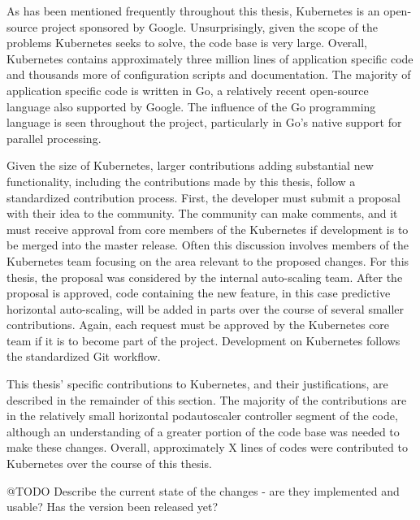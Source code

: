 As has been mentioned frequently throughout this thesis, Kubernetes is an
open-source project sponsored by Google. Unsurprisingly, given the scope of the
problems Kubernetes seeks to solve, the code base is very large. Overall,
Kubernetes contains approximately three million lines of application specific
code and thousands more of configuration scripts and documentation. The majority
of application specific code is written in Go, a relatively recent open-source
language also supported by Google. The influence of the Go programming language
is seen throughout the project, particularly in Go's native support for parallel
processing.

Given the size of Kubernetes, larger contributions adding substantial new functionality,
including the contributions made by this thesis, follow a standardized contribution process.
First, the developer must submit a proposal with their idea to the community.
The community can make comments, and it must receive approval from core members
of the Kubernetes if development is to be merged into the master release. Often
this discussion involves members of the Kubernetes team focusing on the area
relevant to the proposed changes. For this thesis, the proposal was considered
by the internal auto-scaling team. After the proposal is approved, code
containing the new feature, in this case predictive horizontal auto-scaling,
will be added in parts over the course of several smaller contributions. Again,
each request must be approved by the Kubernetes core team if it is to become
part of the project. Development on Kubernetes follows the standardized Git workflow.

This thesis' specific contributions to Kubernetes, and their justifications,
are described in the remainder of this section. The majority of the
contributions are in the relatively small horizontal podautoscaler controller
segment of the code, although an understanding of a greater portion of the code
base was needed to make these changes. Overall, approximately X lines of codes
were contributed to Kubernetes over the course of this thesis.

@TODO Describe the current state of the changes - are they implemented and
usable? Has the version been released yet?
